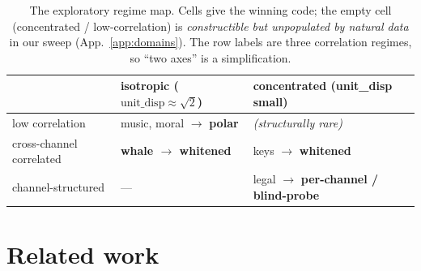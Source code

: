 \documentclass[11pt]{article}
\theoremstyle{remark}
\begin{document}
\begin{table}[h]\small\centering
\caption{The exploratory regime map. Cells give the winning code; the empty cell
(concentrated / low-correlation) is \emph{constructible but unpopulated by natural data} in
our sweep (App.~\ref{app:domains}). The row labels are three correlation regimes, so ``two
axes'' is a simplification.}
\label{tab:regime}
\begin{tabular}{@{}l>{\centering\arraybackslash}p{3.2cm}>{\centering\arraybackslash}p{3.2cm}@{}}
\toprule
 & isotropic ($\text{unit\_disp}\approx\sqrt2$) & concentrated (unit\_disp small) \\
\midrule
low correlation & music, moral $\to$ \textbf{polar} & \emph{(structurally rare)} \\
cross-channel correlated & \textbf{whale $\to$ whitened} & keys $\to$ \textbf{whitened} \\
channel-structured & --- & legal $\to$ \textbf{per-channel / blind-probe} \\
\bottomrule
\end{tabular}
\end{table}

\section{Related work}\label{sec:related}
\end{document}
